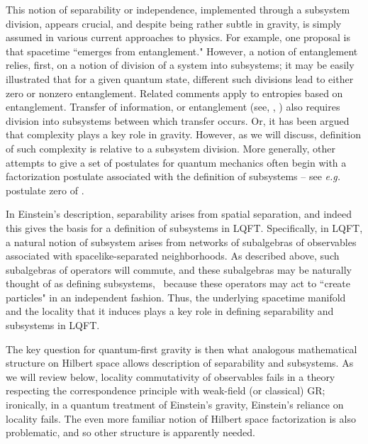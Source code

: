 This notion of separability or independence, implemented through a subsystem division, appears crucial, and despite being rather subtle in gravity, is simply assumed in various current approaches to physics.  For example, one proposal is that spacetime ``emerges from entanglement."  However, a notion of entanglement relies, first, on a notion of division of a system into subsystems; it may be easily illustrated that for a given quantum state, different such divisions lead to either zero or nonzero entanglement.  Related comments apply to entropies based on entanglement. Transfer of information, or entanglement (see, \eg, ) also requires division into subsystems between which transfer occurs.  Or, it has been argued that complexity plays a key role in gravity.  However, as we will discuss, definition of such complexity is relative to a subsystem division.  More generally, other attempts to give a set of postulates for quantum mechanics often begin with a factorization postulate associated with the definition of subsystems -- see {\it e.g.} postulate zero of .

In Einstein's description, separability arises from spatial separation, and indeed this gives the basis for a definition of subsystems in LQFT.  Specifically, in LQFT, a natural notion of subsystem arises from networks of subalgebras of observables associated with spacelike-separated neighborhoods.  As described above, such subalgebras of operators will commute, and these subalgebras may be naturally thought of as defining subsystems, \eg\ because these operators may  act to ``create particles" in an independent fashion.  Thus, the underlying spacetime manifold and the locality that it induces plays a key role in defining separability and subsystems in LQFT.  

The key question for quantum-first gravity is then what analogous mathematical structure on Hilbert space allows description of separability and subsystems.  As we will review below, locality commutativity of observables fails in a theory respecting the correspondence principle with weak-field (or classical) GR;   ironically, in a quantum treatment of Einstein's gravity, Einstein's reliance on locality fails.  
The even more familiar notion of Hilbert space factorization is also problematic, and so other structure is apparently needed.

